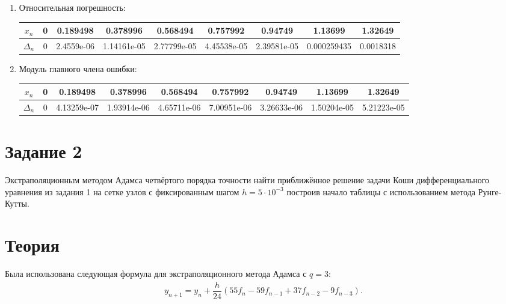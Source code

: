 \documentclass[10pt,a4paper,oneside,russian]{article}
\begin{document}
\begin{enumerate}
  \item Относительная погрешность:

  \begin{tabular}{|c|c|c|c|c|c|c|c|c|}
    \hline
    $x_n$  & 0 & 0.189498 & 0.378996 & 0.568494 & 0.757992 & 0.94749 & 1.13699 & 1.32649\\\hline
    $\Delta_n$ & 0 & 2.4559e-06 & 1.14161e-05 & 2.77799e-05 & 4.45538e-05 & 2.39581e-05 & 0.000259435 & 0.0018318\\\hline
  \end{tabular}

  \item Модуль главного члена ошибки:

  \begin{tabular}{|c|c|c|c|c|c|c|c|c|}
    \hline
    $x_n$   & 0 & 0.189498 & 0.378996 & 0.568494 & 0.757992 & 0.94749 & 1.13699 & 1.32649\\\hline
    $\Delta_n$ & 0 & 4.13259e-07 & 1.93914e-06 & 4.65711e-06 & 7.00951e-06 & 3.26633e-06 & 1.50204e-05 & 5.21223e-05\\\hline
  \end{tabular}
\end{enumerate}

\section{Задание 2}
Экстраполяционным методом Адамса четвёртого порядка точности найти приближённое
решение задачи Коши дифференциального уравнения из задания 1 на сетке узлов с
фиксированным шагом $h = 5 \cdot 10^{-3}$ построив начало таблицы с использованием метода Рунге-Кутты.
\section{Теория}
Была использована следующая формула для экстраполяционного метода Адамса с $q = 3$:
\begin{align*}
  y_{n + 1} = y_n + \dfrac{h}{24}(55f_n - 59f_{n - 1} + 37f_{n - 2} - 9f_{n - 3}).
\end{align*}
\end{document}
